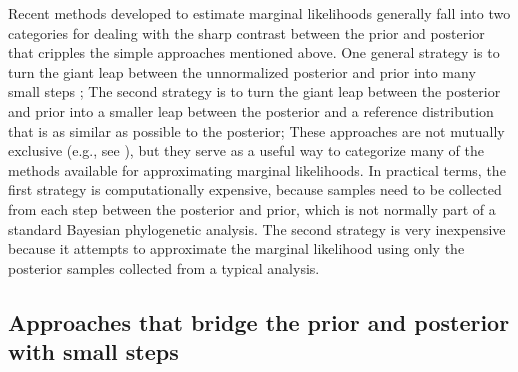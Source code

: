 Recent methods developed to estimate marginal likelihoods generally fall into
two categories for dealing with the sharp contrast between the prior and
posterior that cripples the simple approaches mentioned above.
One general strategy is to turn the giant leap between the unnormalized
posterior and prior into many small steps ;
The second strategy is to turn the giant leap between the posterior and prior
into a smaller leap between the posterior and a reference distribution that is
as similar as possible to the posterior;
These approaches are not mutually exclusive (e.g., see \citet{Fan2011}), but
they serve as a useful way to categorize many of the methods available for
approximating marginal likelihoods.
In practical terms, the first strategy is computationally expensive, because
samples need to be collected from each step between the posterior and prior,
which is not normally part of a standard Bayesian phylogenetic analysis.
The second strategy is very inexpensive because it attempts to approximate the
marginal likelihood using only the posterior samples collected from a
typical analysis.

\subsection{Approaches that bridge the prior and posterior with small steps}


